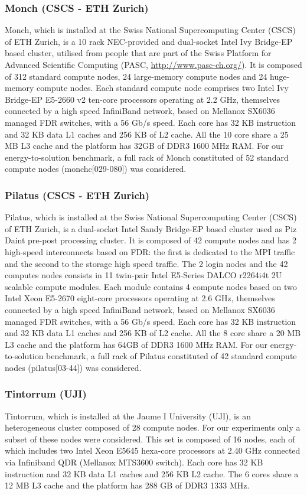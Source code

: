 \subsubsection{Monch (CSCS - ETH Zurich)}
Monch, which is installed  at the Swiss National Supercomputing Center
(CSCS) of ETH Zurich, is  a 10 rack NEC-provided and dual-socket Intel
Ivy Bridge-EP based cluster, utilised from people that are part of the
Swiss    Platform   for    Advanced   Scientific    Computing   (PASC,
\url{http://www.pasc-ch.org/}). It is composed of 312 standard compute
nodes, 24 large-memory compute nodes and 24 huge-memory compute nodes.
Each standard  compute node comprises two Intel  Ivy Bridge-EP E5-2660
v2 ten-core processors operating at 2.2 GHz, themselves connected by a
high speed  InfiniBand network, based  on Mellanox SX6036  managed FDR
switches, with a  56 Gb/s speed.  Each core has  32 KB instruction and
32 KB data L1  caches and 256 KB of L2 cache. All  the 10 core share a
25 MB L3 cache and the platform has 32GB of DDR3 1600 MHz RAM. For our
energy-to-solution benchmark,  a full rack of Monch  constituted of 52
standard  compute   nodes  (monchc[029-080])  was   considered.

\subsubsection{Pilatus (CSCS - ETH Zurich)}
Pilatus,  which  is installed  at  the  Swiss National  Supercomputing
Center (CSCS)  of ETH Zurich,  is a dual-socket Intel  Sandy Bridge-EP
based cluster  used as Piz  Daint pre-post processing cluster.   It is
composed of 42 compute nodes  and has 2 high-speed interconnects based
on FDR:  the first is dedicated to  the MPI traffic and  the second to
the storage high speed traffic.  The 2 login nodes and the 42 computes
nodes  consists in  11  twin-pair Intel  E5-Series  DALCO r2264i4t  2U
scalable compute modules.  Each  module contains 4 compute nodes based
on two Intel Xeon E5-2670  eight-core processors operating at 2.6 GHz,
themselves  connected by  a high  speed InfiniBand  network,  based on
Mellanox SX6036 managed FDR switches,  with a 56 Gb/s speed. Each core
has 32 KB instruction and 32 KB data L1 caches and 256 KB of L2 cache.
All the  8 core share a  20 MB L3 cache  and the platform  has 64GB of
DDR3 1600 MHz  RAM. For our energy-to-solution benchmark,  a full rack
of Pilatus  constituted of 42 standard  compute nodes (pilatus[03-44])
was considered.

\subsubsection{Tintorrum (UJI)}
Tintorrum, which is installed at the Jaume I University (UJI),  is an 
heterogeneous cluster composed of 28 compute nodes. For our experiments
only a subset of these nodes were considered. This set is composed of 
16 nodes, each of which includes two Intel Xeon E5645 hexa-core processors at 
2.40 GHz connected via Infiniband QDR (Mellanox MTS3600 switch). 
Each core has 32 KB instruction and 32 KB data L1 caches and 
256 KB L2 cache. The 6 cores share a 12 MB L3 cache and the platform has 
288 GB of DDR3 1333 MHz.

